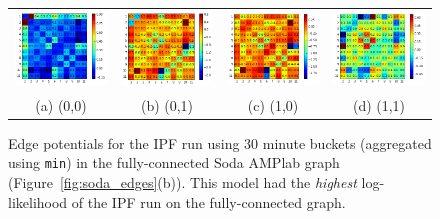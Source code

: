 
\begin{figure}[ht]
\centering
\begin{tabular}{cccc}
\includegraphics[width=1.3in]{figs/30minmin00fullconf} & \includegraphics[width=1.3in]{figs/30minmin01fullconf} & \includegraphics[width=1.3in]{figs/30minmin10fullconf} & \includegraphics[width=1.3in]{figs/30minmin11fullconf} \\
(a) (0,0) & (b) (0,1) & (c) (1,0) & (d) (1,1) \\[6pt]
\end{tabular}
\caption{Edge potentials for the IPF run using 30 minute buckets (aggregated using \texttt{min}) in the fully-connected Soda AMPlab graph (Figure~\ref{fig:soda_edges}(b)). This model had the \emph{highest} log-likelihood of the IPF run on the fully-connected graph.}
\label{fig:30minminfull}
\end{figure}


